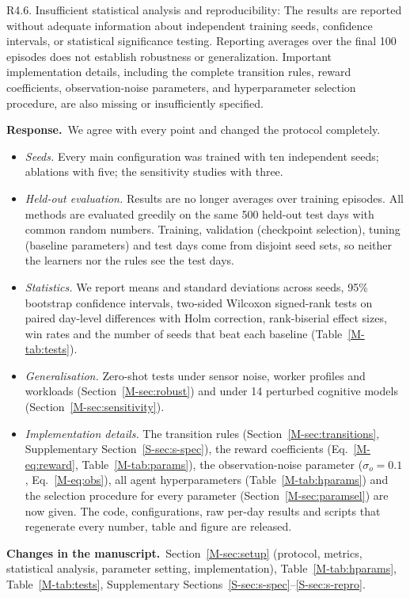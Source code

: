 \documentclass[11pt]{article}
\newcommand{\resp}{\par\smallskip\noindent\textbf{Response.}~}
\newcommand{\change}{\par\smallskip\noindent\textbf{Changes in the manuscript.}~}
\newcommand{\Sec}[1]{Section~\ref{M-#1}}
\newcommand{\Eq}[1]{Eq.~\eqref{M-#1}}
\newcommand{\Tab}[1]{Table~\ref{M-#1}}
\begin{document}
\begin{rcomment}{R4.6.}
Insufficient statistical analysis and reproducibility: The results are reported without adequate information about independent training seeds, confidence intervals, or statistical significance testing. Reporting averages over the final 100 episodes does not establish robustness or generalization. Important implementation details, including the complete transition rules, reward coefficients, observation-noise parameters, and hyperparameter selection procedure, are also missing or insufficiently specified.
\end{rcomment}
\resp We agree with every point and changed the protocol completely.
\begin{itemize}
\item \emph{Seeds.} Every main configuration was trained with ten independent seeds; ablations with five; the sensitivity studies with three.
\item \emph{Held-out evaluation.} Results are no longer averages over training episodes. All methods are evaluated greedily on the same 500 held-out test days with common random numbers. Training, validation (checkpoint selection), tuning (baseline parameters) and test days come from disjoint seed sets, so neither the learners nor the rules see the test days.
\item \emph{Statistics.} We report means and standard deviations across seeds, 95\% bootstrap confidence intervals, two-sided Wilcoxon signed-rank tests on paired day-level differences with Holm correction, rank-biserial effect sizes, win rates and the number of seeds that beat each baseline (\Tab{tab:tests}).
\item \emph{Generalisation.} Zero-shot tests under sensor noise, worker profiles and workloads (\Sec{sec:robust}) and under 14 perturbed cognitive models (\Sec{sec:sensitivity}).
\item \emph{Implementation details.} The transition rules (\Sec{sec:transitions}, Supplementary Section~\ref{S-sec:s-spec}), the reward coefficients (\Eq{eq:reward}, \Tab{tab:params}), the observation-noise parameter ($\sigma_o=0.1$, \Eq{eq:obs}), all agent hyperparameters (\Tab{tab:hparams}) and the selection procedure for every parameter (\Sec{sec:paramsel}) are now given. The code, configurations, raw per-day results and scripts that regenerate every number, table and figure are released.
\end{itemize}
\change \Sec{sec:setup} (protocol, metrics, statistical analysis, parameter setting, implementation), \Tab{tab:hparams}, \Tab{tab:tests}, Supplementary Sections~\ref{S-sec:s-spec}--\ref{S-sec:s-repro}.
\end{document}
